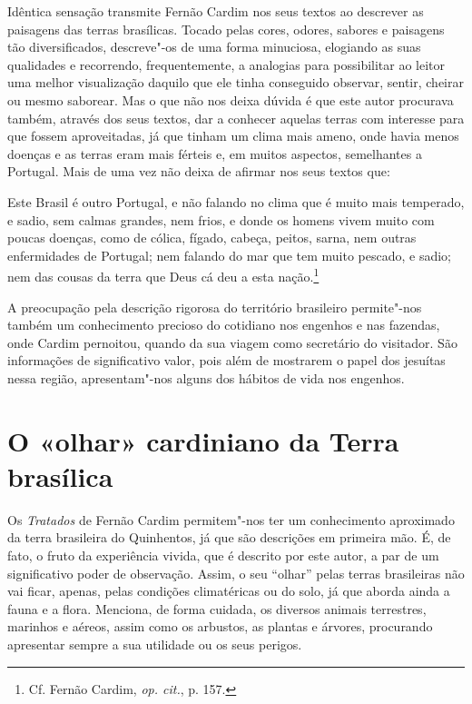 Idêntica sensação transmite Fernão Cardim nos seus textos ao
descrever as paisagens das terras brasílicas. Tocado pelas cores,
odores, sabores e paisagens tão diversificados, descreve"-os de uma
forma minuciosa, elogiando as suas qualidades e recorrendo,
frequentemente, a analogias para possibilitar ao leitor uma melhor
visualização daquilo que ele tinha conseguido observar, sentir, cheirar
ou mesmo saborear. Mas o que não nos deixa dúvida é que este autor
procurava também, através dos seus textos, dar a conhecer aquelas
terras com interesse para que fossem aproveitadas, já que tinham um clima
mais ameno, onde havia menos doenças e as terras eram mais férteis e,
em muitos aspectos, semelhantes a Portugal. Mais de uma vez não deixa
de afirmar nos seus textos que:

\begin{hedraquote} 
Este Brasil é outro Portugal, e não falando no clima que é
muito mais temperado, e sadio, sem calmas grandes, nem frios, e donde
os homens vivem muito com poucas doenças, como de cólica, fígado,
cabeça, peitos, sarna, nem outras enfermidades de Portugal; nem falando
do mar que tem muito pescado, e sadio; nem das cousas da terra que Deus
cá deu a esta nação.\footnote{ Cf. Fernão Cardim, \textit{op. cit.}, p. 157.} 
\end{hedraquote}

 A preocupação pela descrição rigorosa do território
brasileiro permite"-nos também um conhecimento precioso do cotidiano
nos engenhos e nas fazendas, onde Cardim pernoitou, quando da sua
viagem como secretário do visitador. São informações de significativo
valor, pois além de mostrarem o papel dos jesuítas nessa região,
apresentam"-nos alguns dos hábitos de vida nos engenhos.

\section*{O «olhar» cardiniano da Terra brasílica}

 Os \textit{Tratados} de Fernão Cardim permitem"-nos ter um
conhecimento aproximado da terra brasileira do Quinhentos, já que são
descrições em primeira mão. É, de fato, o fruto da experiência vivida,
que é descrito por este autor, a par de um significativo poder de
observação. Assim, o seu ``olhar'' pelas terras brasileiras não vai
ficar, apenas, pelas condições climatéricas ou do solo, já que aborda
ainda a fauna e a flora. Menciona, de forma cuidada, os diversos
animais terrestres, marinhos e aéreos, assim como os arbustos, as
plantas e árvores, procurando apresentar sempre a sua utilidade ou os seus perigos.

